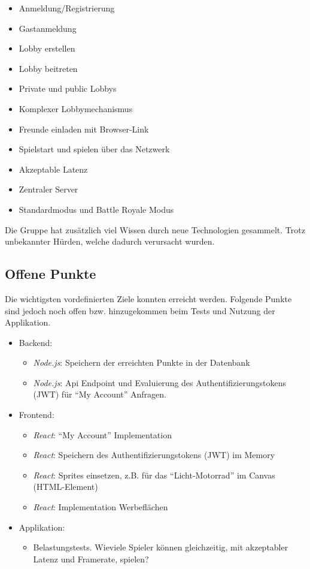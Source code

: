 \documentclass[11pt,ngerman]{article}
\newcommand{\quotes}[1]{``#1''}
\begin{document}
	\begin{itemize}
		\item Anmeldung/Registrierung
		\item Gastanmeldung
		\item Lobby erstellen
		\item Lobby beitreten
		\item Private und public Lobbys
		\item Komplexer Lobbymechanismus
		\item Freunde einladen mit Browser-Link
		\item Spielstart und spielen über das Netzwerk
		\item Akzeptable Latenz
		\item Zentraler Server
		\item Standardmodus und Battle Royale Modus
	\end{itemize}
    Die Gruppe hat zusätzlich viel Wissen durch neue Technologien gesammelt. Trotz unbekannter Hürden, welche dadurch verursacht wurden.

    \subsection{Offene Punkte}
    Die wichtigsten vordefinierten Ziele konnten erreicht werden. Folgende Punkte sind jedoch noch offen bzw. hinzugekommen beim Tests und Nutzung der Applikation.

	\begin{itemize}
        \item Backend:
            \begin{itemize}
                \item \textit{Node.js}: Speichern der erreichten Punkte in der Datenbank
                \item \textit{Node.js}:  Api Endpoint und Evaluierung des Authentifizierungstokens (JWT) für \quotes{My Account} Anfragen.
            \end{itemize}
       \item Frontend:
            \begin{itemize}
                \item \textit{React}: \quotes{My Account} Implementation
                \item \textit{React}: Speichern des Authentifizierungstokens (JWT) im Memory
                \item \textit{React}: \Glspl{Sprite} einsetzen, z.B. für das \quotes{Licht-Motorrad} im \Gls{Canvas} (HTML-Element)
                 \item \textit{React}: Implementation Werbeflächen
            \end{itemize}
        \item Applikation:
            \begin{itemize}
                \item Belastungstests. Wieviele Spieler können gleichzeitig, mit akzeptabler Latenz und Framerate, spielen?
            \end{itemize}
	\end{itemize}
\end{document}
